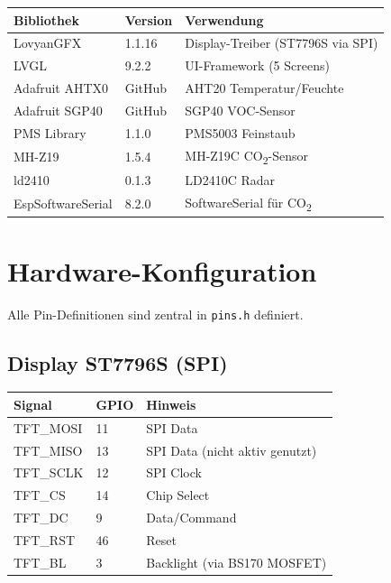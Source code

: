\documentclass[a4paper,11pt]{article}
\begin{document}
\begin{longtable}{p{4.5cm} p{3cm} p{5.5cm}}
\toprule
\rowcolor{tableheader}
\textbf{Bibliothek} & \textbf{Version} & \textbf{Verwendung} \\
\midrule
\endhead
LovyanGFX       & 1.1.16 & Display-Treiber (ST7796S via SPI) \\
LVGL             & 9.2.2  & UI-Framework (5 Screens) \\
Adafruit AHTX0   & GitHub & AHT20 Temperatur/Feuchte \\
Adafruit SGP40   & GitHub & SGP40 VOC-Sensor \\
PMS Library      & 1.1.0  & PMS5003 Feinstaub \\
MH-Z19           & 1.5.4  & MH-Z19C CO\textsubscript{2}-Sensor \\
ld2410           & 0.1.3  & LD2410C Radar \\
EspSoftwareSerial & 8.2.0 & SoftwareSerial für CO\textsubscript{2} \\
\bottomrule
\end{longtable}

\section{Hardware-Konfiguration}

Alle Pin-Definitionen sind zentral in \texttt{pins.h} definiert.

\subsection{Display ST7796S (SPI)}

\begin{longtable}{p{3cm} p{2.5cm} p{7.5cm}}
\toprule
\rowcolor{tableheader}
\textbf{Signal} & \textbf{GPIO} & \textbf{Hinweis} \\
\midrule
\endhead
TFT\_MOSI & 11 & SPI Data \\
TFT\_MISO & 13 & SPI Data (nicht aktiv genutzt) \\
TFT\_SCLK & 12 & SPI Clock \\
TFT\_CS   & 14 & Chip Select \\
TFT\_DC   & 9  & Data/Command \\
TFT\_RST  & 46 & Reset \\
TFT\_BL   & 3  & Backlight (via BS170 MOSFET) \\
\bottomrule
\end{longtable}
\end{document}

